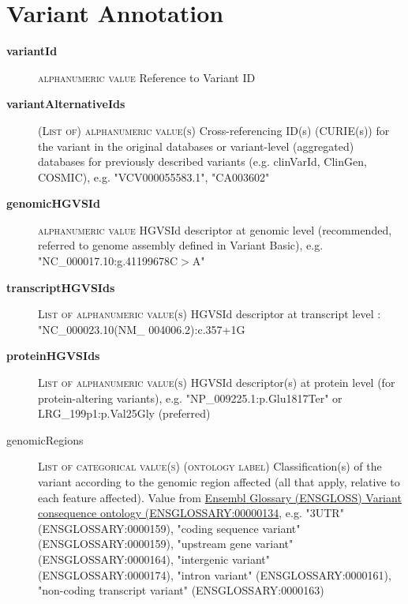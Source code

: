 \documentclass[a4paper, 10pt]{article}        %
\begin{document}
 
  \section*{ {\color{teal} Variant Annotation}}
  
  \begin{description}
	\item[\textbf{variantId}] {\textsc{alphanumeric value}} Reference to Variant ID 	\item[\textbf{variantAlternativeIds}] {\textsc{(List of) alphanumeric value(s)}} Cross-referencing ID(s) (CURIE(s)) for the variant in the original databases or variant-level (aggregated) databases for previously described variants (e.g. clinVarId, ClinGen, COSMIC), e.g. "VCV000055583.1", "CA003602"
	\item[\textbf{genomicHGVSId}]  {\textsc{alphanumeric value}} HGVSId descriptor at genomic level (recommended, referred to genome assembly defined in Variant Basic), e.g. "NC\_000017.10:g.41199678C$>$A"
	\item[\textbf{transcriptHGVSIds}] {\textsc{List of alphanumeric value(s)}} HGVSId descriptor at transcript level : "NC\_000023.10(NM\_ 004006.2):c.357+1G%
	\item[\textbf{proteinHGVSIds}] {\textsc{List of alphanumeric value(s)}} HGVSId descriptor(s) at protein level (for protein-altering variants), e.g. "NP\_009225.1:p.Glu1817Ter" or LRG\_199p1:p.Val25Gly (preferred)
	\item[genomicRegions] {\textsc{List of categorical value(s) (ontology label)}} Classification(s) of the variant according to the genomic region affected (all that apply, relative to each feature affected). Value from \href{http://ensembl.org/glossary/ENSGLOSSARY_0000134}{Ensembl Glossary (ENSGLOSS) Variant consequence ontology (ENSGLOSSARY:00000134}, e.g. "3UTR" (ENSGLOSSARY:0000159), "coding sequence variant" (ENSGLOSSARY:0000159), "upstream gene variant" (ENSGLOSSARY:0000164), "intergenic variant" (ENSGLOSSARY:0000174), "intron variant" (ENSGLOSSARY:0000161), "non-coding transcript variant" (ENSGLOSSARY:0000163)


\end{description}
\end{document}
